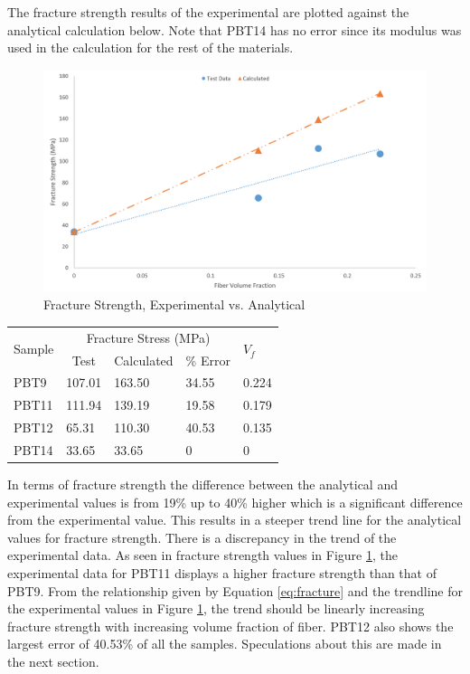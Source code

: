 \documentclass[11pt]{article}
\begin{document}
The fracture strength results of the experimental are plotted against the analytical calculation below. Note that PBT14 has no error since its modulus was used in the calculation for the rest of the materials.

\begin{figure}[H]
\centering
\includegraphics[width=.95\linewidth]{figures/fracture_stress_test_vs_calc.png}
\caption{Fracture Strength, Experimental vs. Analytical}
\label{FScompare}
\end{figure}


\begin{center}
 \label{tab:ComparingFracture}
\begin{tabular}{p{1.25cm} ||  p{1.5cm} | p{1.5cm} | p{1.5cm} | p{1cm}}
\hline
 \multirow{2}{*}{Sample} & \multicolumn{3}{c|}{Fracture Stress (MPa)} & \multirow{2}{*}{\(V_f\)} \\
   &  \multicolumn{1}{c}{Test} & \multicolumn{1}{c}{Calculated} & \multicolumn{1}{c|}{\% Error} &\\
\hline
PBT9 & 107.01 & 163.50 & 34.55 & 0.224\\
PBT11 &  111.94 & 139.19 & 19.58 & 0.179\\
PBT12 &  65.31 & 110.30 & 40.53 & 0.135 \\
PBT14 & 33.65 & 33.65 & 0 & 0\\
\hline
\end{tabular}
\end{center}
\singlespacing

In terms of fracture strength the difference between the analytical and experimental values is from 19\% up to 40\% higher which is a significant difference from the experimental value. This results in a steeper trend line for the analytical values for fracture strength. There is a discrepancy in the trend of the experimental data. As seen in fracture strength values in Figure \ref{FScompare}, the experimental data for PBT11 displays a higher fracture strength than that of PBT9. From the relationship given by Equation \ref{eq:fracture} and the trendline for the experimental values in Figure \ref{FScompare}, the trend should be linearly increasing fracture strength with increasing volume fraction of fiber. PBT12 also shows the largest error of 40.53\% of all the samples. Speculations about this are made in the next section.
\singlespacing
\end{document}
